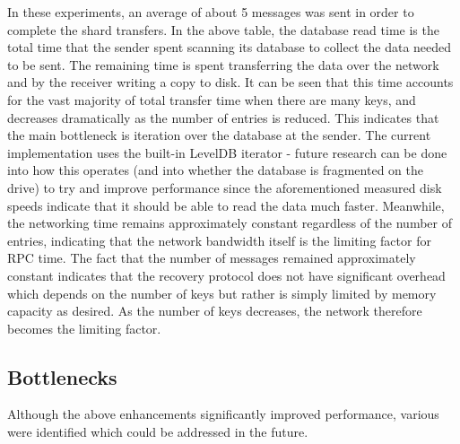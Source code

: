 \documentclass[letterpaper,10pt]{article}
\begin{document}
In these experiments, an average of about 5 messages was sent in order
to complete the shard transfers.  In the above table, the database
read time is the total time that the sender spent scanning its
database to collect the data needed to be sent.  The remaining time is
spent transferring the data over the network and by the receiver
writing a copy to disk.  It can be seen that this time accounts for
the vast majority of total transfer time when there are many keys, and
decreases dramatically as the number of entries is reduced.  This
indicates that the main bottleneck is iteration over the database at
the sender.  The current implementation uses the built-in LevelDB
iterator - future research can be done into how this operates (and
into whether the database is fragmented on the drive) to try and
improve performance since the aforementioned measured disk speeds
indicate that it should be able to read the data much faster.
Meanwhile, the networking time remains approximately constant
regardless of the number of entries, indicating that the network
bandwidth itself is the limiting factor for RPC time.  The fact that
the number of messages remained approximately constant indicates that
the recovery protocol does not have significant overhead which depends
on the number of keys but rather is simply limited by memory capacity
as desired.  As the number of keys decreases, the network therefore
becomes the limiting factor.





\subsection{Bottlenecks}

Although the above enhancements significantly improved performance, various were identified which could be addressed in the future.
\end{document}
